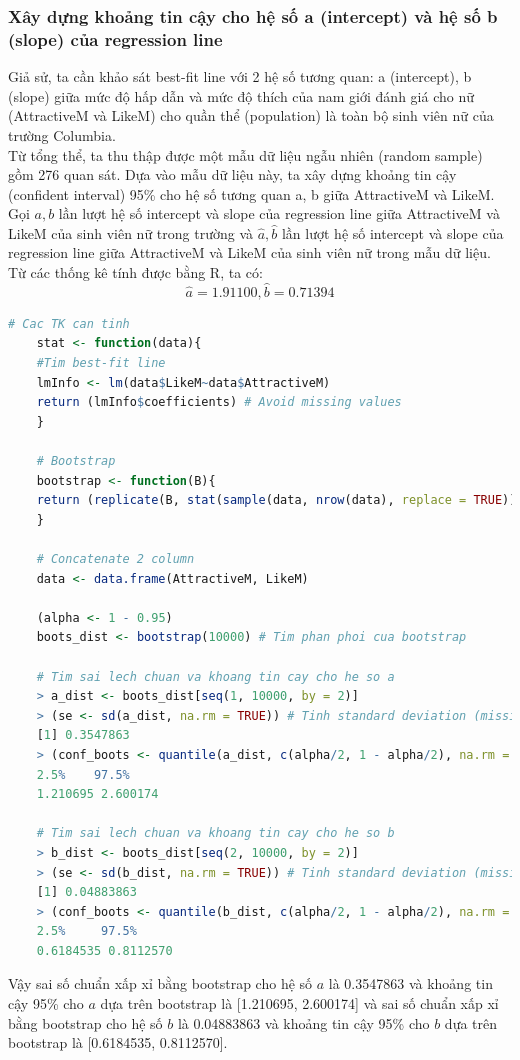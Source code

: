 \documentclass[a4paper,12pt]{article}
\begin{document}
	\subsubsection{Xây dựng khoảng tin cậy cho hệ số a (intercept) và hệ số b (slope) của regression line}
	
	Giả sử, ta cần khảo sát best-fit line với 2 hệ số tương quan: a (intercept), b (slope) giữa mức độ hấp dẫn và mức độ thích của nam giới đánh giá cho nữ (AttractiveM và LikeM) cho quần thể (population) là toàn bộ sinh viên nữ của trường Columbia.\\
	
	Từ tổng thể, ta thu thập được một mẫu dữ liệu ngẫu nhiên (random sample) gồm 276 quan sát. Dựa vào mẫu dữ liệu này, ta xây dựng khoảng tin cậy (confident interval) 95\% cho hệ số tương quan a, b giữa AttractiveM và LikeM.\\
	
	Gọi $a, b$ lần lượt hệ số intercept và slope của regression line giữa AttractiveM và LikeM của sinh viên nữ trong trường và $\hat{a}, \hat{b}$ lần lượt hệ số intercept và slope của regression line giữa AttractiveM và LikeM của sinh viên nữ trong mẫu dữ liệu. Từ các thống kê tính được bằng R, ta có: 
	$$\hat{a} =  1.91100, \hat{b} = 0.71394$$
	
	\begin{lstlisting}[language=R]
	# Cac TK can tinh
	stat <- function(data){
	#Tim best-fit line
	lmInfo <- lm(data$LikeM~data$AttractiveM)
	return (lmInfo$coefficients) # Avoid missing values
	}
	
	# Bootstrap
	bootstrap <- function(B){
	return (replicate(B, stat(sample(data, nrow(data), replace = TRUE))))
	}
	
	# Concatenate 2 column
	data <- data.frame(AttractiveM, LikeM)
	
	(alpha <- 1 - 0.95)
	boots_dist <- bootstrap(10000) # Tim phan phoi cua bootstrap
	
	# Tim sai lech chuan va khoang tin cay cho he so a
	> a_dist <- boots_dist[seq(1, 10000, by = 2)]
	> (se <- sd(a_dist, na.rm = TRUE)) # Tinh standard deviation (missing value se bi bo qua)
	[1] 0.3547863
	> (conf_boots <- quantile(a_dist, c(alpha/2, 1 - alpha/2), na.rm = TRUE)) # Tim khoang tin cay cho a
	2.5%    97.5% 
	1.210695 2.600174 
	
	# Tim sai lech chuan va khoang tin cay cho he so b
	> b_dist <- boots_dist[seq(2, 10000, by = 2)]
	> (se <- sd(b_dist, na.rm = TRUE)) # Tinh standard deviation (missing value se bi bo qua)
	[1] 0.04883863
	> (conf_boots <- quantile(b_dist, c(alpha/2, 1 - alpha/2), na.rm = TRUE)) # Tim khoang tin cay cho b
	2.5%     97.5% 
	0.6184535 0.8112570
	\end{lstlisting}
	Vậy sai số chuẩn xấp xỉ bằng bootstrap cho hệ số $a$ là 0.3547863 và khoảng tin cậy 95\% cho $a$ dựa trên bootstrap là [1.210695, 2.600174] và sai số chuẩn xấp xỉ bằng bootstrap cho hệ số $b$ là 0.04883863 và khoảng tin cậy 95\% cho $b$ dựa trên bootstrap là [0.6184535, 0.8112570].
	
\end{document}
